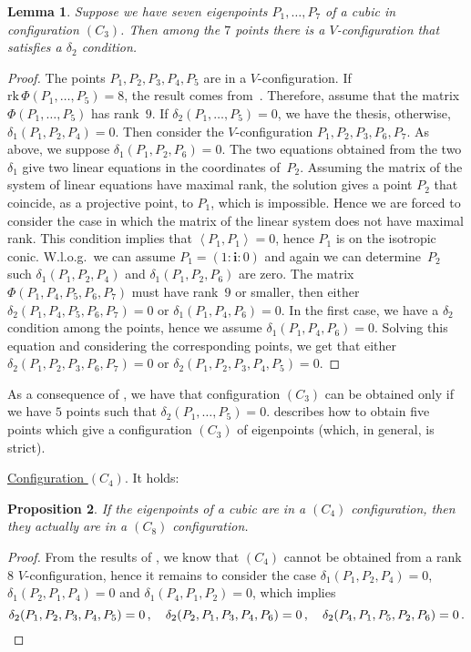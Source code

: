 \documentclass{amsart}
\theoremstyle{plain}
\newtheorem{lemma}{Lemma}[section]
\newtheorem{prop}[lemma]{Proposition}
\theoremstyle{definition}
\newcommand{\scl}[2]{\left\langle {#1}, {#2} \right\rangle}
\newcommand{\iii}{\textbf{i}}
\newcommand{\rk}{\ensuremath{\mathrm{rk}}}
\begin{document}
\begin{lemma}
\label{no_delta1_delta1} Suppose we have seven eigenpoints $P_1, \dots, P_7$
of a cubic in configuration $(C_3)$. Then among the $7$ points there is a
$V$-configuration that satisfies a $\delta_2$ condition.
\end{lemma}
\begin{proof}
The points $P_1, P_2, P_3, P_4, P_5$ are in a $V$-configuration. If
$\rk \, \Phi(P_1, \dots, P_5) = 8$, the result comes from~.
Therefore, assume that the matrix $\Phi(P_1, \dots, P_5)$ has
rank~$9$. If
$\delta_2(P_1, \dots, P_5) = 0$, we have the thesis, otherwise,
$\delta_1(P_1, P_2, P_4) = 0$. Then consider the $V$-configuration
$P_1, P_2, P_3, P_6, P_7$. As above, we suppose $\delta_1(P_1, P_2, P_6) = 0$.
The two equations obtained from the two $\delta_1$ give two
linear equations in the coordinates
of~$P_2$. Assuming the matrix of the system of linear equations have
maximal rank, the solution gives a point $P_2$ that coincide, as
a projective point, to $P_1$, which is impossible. Hence we are forced to
consider the
case in which the matrix of the linear system does not have maximal rank.
This condition implies that $\scl{P_1}{P_1} = 0$, hence $P_1$ is on the
isotropic conic. W.l.o.g.\ we can assume $P_1 = (1: \iii: 0)$ and again
we can determine~$P_2$ such $\delta_1(P_1, P_2, P_4)$ and
$\delta_1(P_1, P_2, P_6)$ are zero. The matrix $\Phi(P_1, P_4, P_5, P_6, P_7)$
must have rank~$9$ or smaller, then either
$\delta_2(P_1, P_4, P_5, P_6, P_7)=0$ or $\delta_1(P_1, P_4, P_6) = 0$. In
the first case, we have a $\delta_2$ condition among the points, hence
we assume $\delta_1(P_1, P_4, P_6) = 0$. Solving this equation and
considering the corresponding points, we get that either
$\delta_2(P_1, P_2, P_3, P_6, P_7) = 0$ or
$\delta_2(P_1, P_2, P_3, P_4, P_5) = 0$.
\end{proof}

As a consequence of , we have that configuration $(C_3)$ can
be obtained only if we have $5$ points such that
$\delta_2(P_1, \dotsc, P_5) = 0$.  describes how to
obtain five points which give a configuration $(C_3)$ of eigenpoints (which, 
in general, is strict).

\underline{Configuration $(C_4)$}. It holds:
\begin{prop}
\label{conf4no} If the eigenpoints of a cubic are in a $(C_4)$ configuration, then they actually are in a $(C_8)$ configuration.
\end{prop}
\begin{proof}
From the results of , we know that $(C_4)$
cannot be obtained from a rank 8 $V$-configuration,
hence it remains to consider the case $\delta_1(P_1, P_2, P_4) = 0$,
$\delta_1(P_2, P_1, P_4) = 0$ and $\delta_1(P_4, P_1, P_2) = 0$,
which implies
%
\[
  \delta_2(P_1, P_2, P_3, P_4, P_5) = 0 \,, \quad
  \delta_2(P_2, P_1, P_3, P_4, P_6) = 0 \,, \quad
  \delta_2(P_4, P_1, P_5, P_2, P_6) = 0 \,. \qedhere
\]
%
\end{proof}
\end{document}
